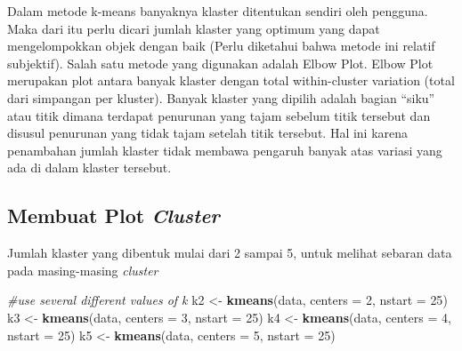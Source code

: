 \documentclass[
]{elegantbook}
\newenvironment{Shaded}{\begin{snugshade}}{\end{snugshade}}
\newcommand{\AttributeTok}[1]{\textcolor[rgb]{0.13,0.29,0.53}{#1}}
\newcommand{\CommentTok}[1]{\textcolor[rgb]{0.56,0.35,0.01}{\textit{#1}}}
\newcommand{\DecValTok}[1]{\textcolor[rgb]{0.00,0.00,0.81}{#1}}
\newcommand{\FunctionTok}[1]{\textcolor[rgb]{0.13,0.29,0.53}{\textbf{#1}}}
\newcommand{\NormalTok}[1]{#1}
\newcommand{\OtherTok}[1]{\textcolor[rgb]{0.56,0.35,0.01}{#1}}
\begin{document}
Dalam metode k-means banyaknya klaster ditentukan sendiri oleh pengguna. Maka dari itu perlu dicari jumlah klaster yang optimum yang dapat mengelompokkan objek dengan baik (Perlu diketahui bahwa metode ini relatif subjektif). Salah satu metode yang digunakan adalah Elbow Plot. Elbow Plot merupakan plot antara banyak klaster dengan total within-cluster variation (total dari simpangan per kluster). Banyak klaster yang dipilih adalah bagian ``siku'' atau titik dimana terdapat penurunan yang tajam sebelum titik tersebut dan disusul penurunan yang tidak tajam setelah titik tersebut. Hal ini karena penambahan jumlah klaster tidak membawa pengaruh banyak atas variasi yang ada di dalam klaster tersebut.

\hypertarget{membuat-plot-cluster}{%
\subsection{\texorpdfstring{Membuat Plot \emph{Cluster}}{Membuat Plot Cluster}}\label{membuat-plot-cluster}}

Jumlah klaster yang dibentuk mulai dari 2 sampai 5, untuk melihat sebaran data pada masing-masing \emph{cluster}

\begin{Shaded}
\begin{Highlighting}[]
\CommentTok{\#use several different values of k}
\NormalTok{k2 }\OtherTok{\textless{}{-}} \FunctionTok{kmeans}\NormalTok{(data, }\AttributeTok{centers =} \DecValTok{2}\NormalTok{, }\AttributeTok{nstart =} \DecValTok{25}\NormalTok{)}
\NormalTok{k3 }\OtherTok{\textless{}{-}} \FunctionTok{kmeans}\NormalTok{(data, }\AttributeTok{centers =} \DecValTok{3}\NormalTok{, }\AttributeTok{nstart =} \DecValTok{25}\NormalTok{)}
\NormalTok{k4 }\OtherTok{\textless{}{-}} \FunctionTok{kmeans}\NormalTok{(data, }\AttributeTok{centers =} \DecValTok{4}\NormalTok{, }\AttributeTok{nstart =} \DecValTok{25}\NormalTok{)}
\NormalTok{k5 }\OtherTok{\textless{}{-}} \FunctionTok{kmeans}\NormalTok{(data, }\AttributeTok{centers =} \DecValTok{5}\NormalTok{, }\AttributeTok{nstart =} \DecValTok{25}\NormalTok{)}
\end{Highlighting}
\end{Shaded}
\end{document}
